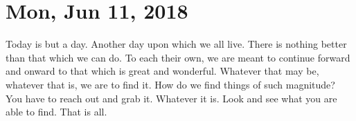 \section{Mon, Jun 11, 2018}

Today is but a day. Another day upon which we all live. There is nothing better
than that which we can do. To each their own, we are meant to continue forward
and onward to that which is great and wonderful. Whatever that may be, whatever
that is, we are to find it. How do we find things of such magnitude? You have to
reach out and grab it. Whatever it is. Look and see what you are able to find.
That is all.
